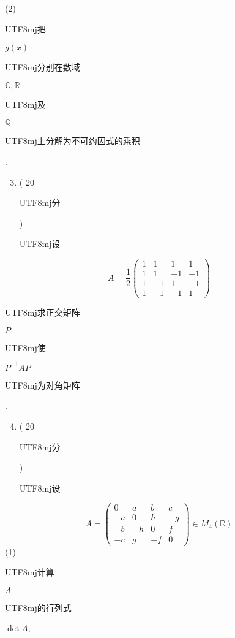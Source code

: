 \documentclass[10pt]{article}
\begin{document}
(2) \begin{CJK}{UTF8}{mj}把\end{CJK} $g(x)$ \begin{CJK}{UTF8}{mj}分别在数域\end{CJK} $\mathbb{C}, \mathbb{R}$ \begin{CJK}{UTF8}{mj}及\end{CJK} $\mathbb{Q}$ \begin{CJK}{UTF8}{mj}上分解为不可约因式的乘积\end{CJK}.

\begin{enumerate}
  \setcounter{enumi}{2}
  \item ( 20 \begin{CJK}{UTF8}{mj}分\end{CJK}) \begin{CJK}{UTF8}{mj}设\end{CJK}
\end{enumerate}
$$
A=\frac{1}{2}\left(\begin{array}{cccc}
1 & 1 & 1 & 1 \\
1 & 1 & -1 & -1 \\
1 & -1 & 1 & -1 \\
1 & -1 & -1 & 1
\end{array}\right)
$$
\begin{CJK}{UTF8}{mj}求正交矩阵\end{CJK} $P$ \begin{CJK}{UTF8}{mj}使\end{CJK} $P^{-1} A P$ \begin{CJK}{UTF8}{mj}为对角矩阵\end{CJK}.

\begin{enumerate}
  \setcounter{enumi}{3}
  \item ( 20 \begin{CJK}{UTF8}{mj}分\end{CJK}) \begin{CJK}{UTF8}{mj}设\end{CJK}
\end{enumerate}
$$
A=\left(\begin{array}{cccc}
0 & a & b & c \\
-a & 0 & h & -g \\
-b & -h & 0 & f \\
-c & g & -f & 0
\end{array}\right) \in M_{4}(\mathbb{R})
$$
(1) \begin{CJK}{UTF8}{mj}计算\end{CJK} $A$ \begin{CJK}{UTF8}{mj}的行列式\end{CJK} $\operatorname{det} A$;
\end{document}
